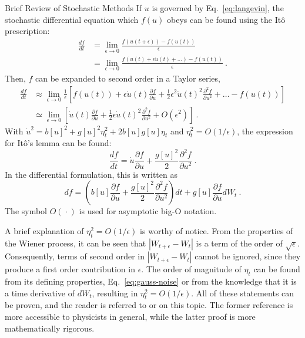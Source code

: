 \begin{chapter}{Brief Review of Stochastic Methods}
If $u$ is governed by Eq.~\eqref{eq:langevin},
the stochastic differential equation which $f(u)$ obeys can be found using
the Itô prescription:
\begin{equation}
\begin{split}
    \frac{df}{dt} &= \lim_{\epsilon \to 0} \frac{f(u(t+\epsilon)) - f(u(t))}{\epsilon} \\
    &= \lim_{\epsilon \to 0} \frac{f(u(t)+\epsilon \dot u(t) + \ldots) - f(u(t))}{\epsilon} \ .
\end{split}
\end{equation}
Then, $f$ can be expanded to second order in a Taylor series,
\begin{equation}
\begin{split}
    \frac{df}{dt} &\approx \lim_{\epsilon \to 0} \frac{1}{\epsilon} \left[ f(u(t)) + \epsilon \dot u(t) \frac{\partial f}{\partial u}
    +\frac12 \epsilon^2 \dot u(t)^2 \frac{\partial^2 f}{\partial u^2} + \ldots - f(u(t)) \right] \\
    &\simeq \lim_{\epsilon \to 0} \left[ \dot u(t) \frac{\partial f}{\partial u}
    +\frac12 \epsilon \dot u(t)^2 \frac{\partial^2 f}{\partial u^2} + O(\epsilon^2) \right] \ .
\end{split}
\end{equation}
With $\dot u^2 = b[u]^2 + g[u]^2 \eta_t^2 + 2 b[u] g[u] \eta_t$
and $\eta_t^2 = O(1/\epsilon)$, the expression for
Itô's lemma can be found:
\begin{equation}
    \frac{df}{dt} = \dot u \frac{\partial f}{\partial u}
    +\frac{g[u]^2}{2} \frac{\partial^2 f}{\partial u^2} \ .
\end{equation}
In the differential formulation, this is written as
\begin{equation}
    df = \left(
    b[u] \frac{\partial f}{\partial u}
    + \frac{g[u]^2}{2} \frac{\partial^2 f}{\partial u^2} \right) dt +
     g[u] \frac{\partial f}{\partial u} d W_t \ .
\end{equation}
The symbol $O(\ \bm\cdot \ )$ is used for asymptotic big-O notation.

A brief explanation of $\eta_t^2 = O(1/\epsilon)$ is worthy of notice.
From the properties of the Wiener process, it can be seen that
$|W_{t+\epsilon} - W_t|$ is a term of the order of $\sqrt{\epsilon}$. Consequently,
terms of second order in $|W_{t+\epsilon}-W_t|$ cannot be ignored,
since they produce a first order contribution in $\epsilon$.
The order of magnitude of $\eta_t$ can be found from
its defining properties, Eq.~\eqref{eq:gauss-noise} or from
the knowledge that it is a time derivative of $dW_t$,
resulting in $\eta_t^2 = O(1/\epsilon)$.
All of these statements can be proven,
and the reader is referred to \textcite[sec.4.2.5]{gardiner2009} or
\textcite[sec.2.5]{protter2005} on this topic.
The former reference is more accessible to physicists in general,
while the latter proof is more mathematically rigorous.


\end{chapter}
